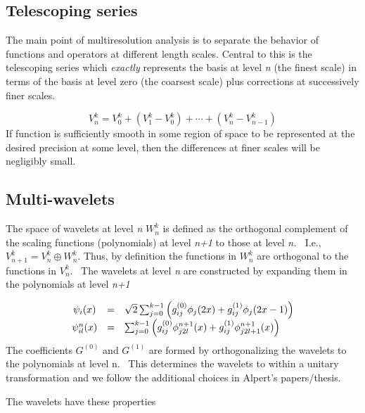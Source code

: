 \documentclass[letterpaper]{article}
\begin{document}
\subsection[Telescoping series]{Telescoping series}
The main point of multiresolution analysis is to separate the behavior of functions and operators at different length
scales. Central to this is the telescoping series which \textit{exactly }represents the basis at level \textit{n }(the
finest scale) in terms of the basis at level zero (the coarsest scale) plus corrections at successively finer scales.

\begin{equation}\label{seq:refText3}
V_{n}^{k}=V_{0}^{k}+\left(V_{1}^{k}-V_{0}^{k}\right)+\cdots +\left(V_{n}^{k}-V_{n-1}^{k}\right)
\end{equation}
If function is sufficiently smooth in some region of space to be represented at the desired precision at some level,
then the differences at finer scales will be negligibly small.

\subsection{Multi-wavelets}
The space of wavelets at level \textit{n } $W_{n}^{k}$ is defined as the orthogonal complement of the scaling functions
(polynomials) at level \textit{n+1} to those at level \textit{n. \ }I.e., $V_{n+1}^{k}=V_{n}^{k}\oplus W_{n}^{k}$.
Thus, by definition the functions in  $W_{n}^{k}$ are orthogonal to the functions in  $V_{n}^{k}$. \ The wavelets at
level \textit{n }are constructed by expanding them in the polynomials at level \textit{n+1}

\begin{equation}\label{seq:refText4}
\begin{matrix}\psi _{i}(x)&\text{=}&\sqrt{2}\sum _{j=0}^{k-1}\left(g_{ij}^{(0)}\phi _{j}(2x)+g_{ij}^{(1)}\phi
_{j}(2x-1)\right)\\\psi _{il}^{n}(x)&\text{=}&\sum _{j=0}^{k-1}\left(g_{ij}^{(0)}\phi _{j2l}^{n+1}(x)+g_{ij}^{(1)}\phi
_{j2l+1}^{n+1}(x)\right)\hfill\null \end{matrix}
\end{equation}
The coefficients  $G^{(0)}$ and  $G^{(1)}$ are formed by orthogonalizing the wavelets to the polynomials at level n.
\ This determines the wavelets to within a unitary transformation and we follow the additional choices in Alpert's
papers/thesis.

The wavelets have these properties
\end{document}
